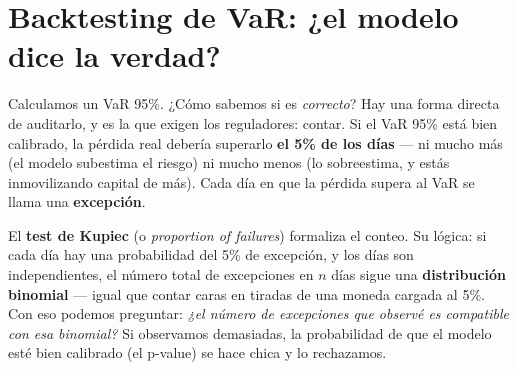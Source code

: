 \documentclass[
  spanish,
  letterpaper,
  DIV=11,
  numbers=noendperiod]{scrreprt}
\begin{document}
\chapter{Backtesting de VaR: ¿el modelo dice la
verdad?}\label{backtesting-de-var-el-modelo-dice-la-verdad}

Calculamos un VaR 95\%. ¿Cómo sabemos si es \emph{correcto}? Hay una
forma directa de auditarlo, y es la que exigen los reguladores: contar.
Si el VaR 95\% está bien calibrado, la pérdida real debería superarlo
\textbf{el 5\% de los días} --- ni mucho más (el modelo subestima el
riesgo) ni mucho menos (lo sobreestima, y estás inmovilizando capital de
más). Cada día en que la pérdida supera al VaR se llama una
\textbf{excepción}.

El \textbf{test de Kupiec} (o \emph{proportion of failures}) formaliza
el conteo. Su lógica: si cada día hay una probabilidad del 5\% de
excepción, y los días son independientes, el número total de excepciones
en \(n\) días sigue una \textbf{distribución binomial} --- igual que
contar caras en tiradas de una moneda cargada al 5\%. Con eso podemos
preguntar: \emph{¿el número de excepciones que observé es compatible con
esa binomial?} Si observamos demasiadas, la probabilidad de que el
modelo esté bien calibrado (el p-value) se hace chica y lo rechazamos.
\end{document}
